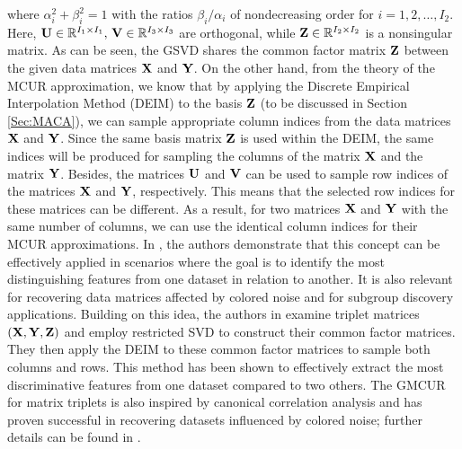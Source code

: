 \documentclass[preprint,12pt]{elsarticle}
\theoremstyle{definition}
\newcommand{\X}{{\bf X}}
\newcommand{\Y}{{\bf Y}}
\newcommand{\Z}{{\bf Z}}
\newcommand{\U}{{\bf U}}
\newcommand{\V}{{\bf V}}
\begin{document}
where $\alpha_i^2+\beta_i^2=1$ with the ratios $\beta_i/\alpha_i$ of nondecreasing order for $i=1,2,\ldots,I_2$. Here, $\U\in\mathbb{R}^{I_1\times I_1},\,\V\in\mathbb{R}^{I_3\times I_3}$ are orthogonal, while $\Z\in\mathbb{R}^{I_2\times I_2}$ is a nonsingular matrix. As can be seen, the GSVD shares the common factor matrix $\Z$ between the given data matrices $\X$ and $\Y$. On the other hand, from the theory of the MCUR approximation, we know that by applying the Discrete Empirical Interpolation Method (DEIM) \cite{sorensen2016deim} to the basis $\Z$ (to be discussed in Section \ref{Sec:MACA}), we can sample appropriate column indices from the data matrices $\X$ and $\Y$. Since the same basis matrix $\Z$ is used within the DEIM, the same indices will be produced for sampling the columns of the matrix $\X$ and the matrix $\Y$. Besides, the matrices $\U$ and $\V$ can be used to sample row indices of the matrices $\X$ and $\Y$, respectively. This means that the selected row indices for these matrices can be different. As a result, for two matrices $\X$ and $\Y$ with the same number of columns, we can use the identical column indices for their MCUR approximations. In \cite{gidisu2022generalized} , the authors demonstrate that this concept can be effectively applied in scenarios where the goal is to identify the most distinguishing features from one dataset in relation to another. It is also relevant for recovering data matrices affected by colored noise and for subgroup discovery applications. Building on this idea, the authors in \cite{gidisu2022restricted} examine triplet matrices $({\bf X},{\bf Y},{\bf Z})$ and employ restricted SVD \cite{zha1991restricted} to construct their common factor matrices. They then apply the DEIM to these common factor matrices to sample both columns and rows. This method has been shown to effectively extract the most discriminative features from one dataset compared to two others. The GMCUR for matrix triplets is also inspired by canonical correlation analysis and has proven successful in recovering datasets influenced by colored noise; further details can be found in \cite{gidisu2022generalized,gidisu2022restricted}. 
\end{document}
